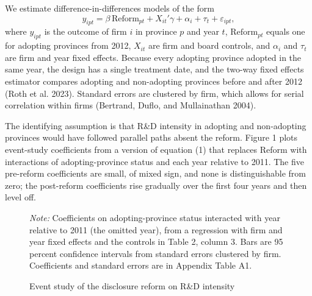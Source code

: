 \documentclass[12pt]{article}
\newcommand{\tabnote}[1]{\par\vspace{2pt}\begin{minipage}{\linewidth}\footnotesize\setstretch{1.0}\textit{Note:} #1\end{minipage}}
\begin{document}
We estimate difference-in-differences models of the form
\begin{equation}
y_{ipt} = \beta \, \text{Reform}_{pt} + X_{it}'\gamma + \alpha_i + \tau_t + \varepsilon_{ipt},
\end{equation}
where $y_{ipt}$ is the outcome of firm $i$ in province $p$ and year $t$, $\text{Reform}_{pt}$ equals one for adopting provinces from 2012, $X_{it}$ are firm and board controls, and $\alpha_i$ and $\tau_t$ are firm and year fixed effects. Because every adopting province adopted in the same year, the design has a single treatment date, and the two-way fixed effects estimator compares adopting and non-adopting provinces before and after 2012 (Roth et al. 2023). Standard errors are clustered by firm, which allows for serial correlation within firms (Bertrand, Duflo, and Mullainathan 2004).

The identifying assumption is that R\&D intensity in adopting and non-adopting provinces would have followed parallel paths absent the reform. Figure 1 plots event-study coefficients from a version of equation (1) that replaces Reform with interactions of adopting-province status and each year relative to 2011. The five pre-reform coefficients are small, of mixed sign, and none is distinguishable from zero; the post-reform coefficients rise gradually over the first four years and then level off.

\begin{figure}[!htbp]
\centering
{}
\caption{Event study of the disclosure reform on R\&D intensity}
\tabnote{Coefficients on adopting-province status interacted with year relative to 2011 (the omitted year), from a regression with firm and year fixed effects and the controls in Table 2, column 3. Bars are 95 percent confidence intervals from standard errors clustered by firm. Coefficients and standard errors are in Appendix Table A1.}
\end{figure}
\end{document}
